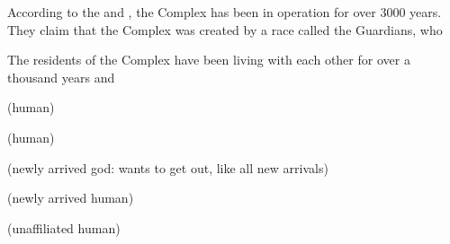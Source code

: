 \documentclass[blue]{guardians}
\begin{document}
\name{\bWhosWho{}}

According to the \cCaretaker{} and \cWarden{}, the Complex has been in operation for over 3000 years. They claim that the Complex was created by a race called the Guardians, who 

The residents of the Complex have been living with each other for over a thousand years and 

\begin{itemz}
 \item \cCaretaker{}
 \item \cWarden{}
 \item \cJascha{} 
\end{itemz}

\begin{itemz}
  \item \cZeus{}
  \item \cHera{}
  \item \cAthena{}
  \item \cHephaestus{}
  \item \cPandora{} (human)
\end{itemz}

\begin{itemz}
  \item \cOdin{}
  \item \cHel{}
  \item \cFenrir{}
  \item \cValkyrie{}
\end{itemz}

\begin{itemz}
  \item \cIsis{}
  \item \cAnubis{}
  \item \cOsiris{}
  \item \cEgyptianHuman{} (human)
\end{itemz}

\begin{itemz}
  \item\cUnity{} (newly arrived god: wants to get out, like all new arrivals)
  \item\cKachiko{} (newly arrived human)
\end{itemz}

(unaffiliated human)
  
\end{document}
